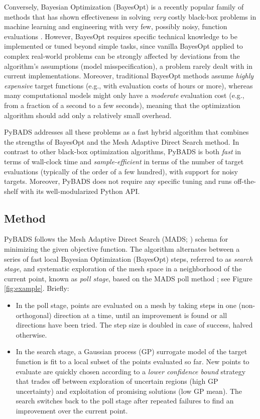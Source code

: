 \documentclass[
]{article}
\begin{document}
Conversely, Bayesian Optimization (BayesOpt) is a recently popular family of methods that has shown effectiveness in solving \textit{very} costly black-box problems in machine learning and engineering with very few, possibly noisy, function evaluations \parencite{garnett_bayesoptbook_2023, reviewBO, agnihotri2020exploring}. However, BayesOpt requires specific technical knowledge to be implemented or tuned beyond simple tasks, since vanilla BayesOpt applied to complex real-world problems can be strongly affected by deviations from the algorithm's assumptions (model misspecification), a problem rarely dealt with in current implementations. Moreover, traditional BayesOpt methods assume \textit{highly expensive} target functions (e.g., with evaluation costs of hours or more), whereas many computational models might only have a \textit{moderate} evaluation cost (e.g., from a fraction of a second to a few seconds), meaning that the optimization algorithm should add only a relatively small overhead. 

PyBADS addresses all these problems as a fast hybrid algorithm that combines the strengths of BayesOpt and the Mesh Adaptive Direct Search \parencite{MADS} method. In contrast to other black-box optimization algorithms, PyBADS is both \textit{fast} in terms of wall-clock time and \textit{sample-efficient} in terms of the number of target evaluations (typically of the order of a few hundred), with support for noisy targets. Moreover, PyBADS does not require any specific tuning and runs off-the-shelf with its well-modularized Python API.

\hypertarget{method}{%
\subsection{Method}\label{method}}
PyBADS follows the Mesh Adaptive Direct Search (MADS; \cite{MADS}) schema for minimizing the given objective function. The algorithm alternates between a series of fast local Bayesian Optimization (BayesOpt) steps, referred to as \textit{search stage}, and systematic exploration of the mesh space in a neighborhood of the current point, known as \textit{poll stage}, based on the MADS poll method \parencite{MADS}; see Figure \ref{fig:example}.
Briefly:
\begin{itemize}
    \item In the poll stage, points are evaluated on a mesh by taking steps in one (non-orthogonal) direction at a time, until an improvement is found or all directions have been tried. The step size is doubled in case of success, halved otherwise.
    \item In the search stage, a Gaussian process (GP) surrogate model \parencite{rasmussen_gaussian_2006} of the target function is fit to a local subset of the points evaluated so far. New points to evaluate are quickly chosen according to a \textit{lower confidence bound} strategy that trades off between exploration of uncertain regions (high GP uncertainty) and exploitation of promising solutions (low GP mean). The search switches back to the poll stage after repeated failures to find an improvement over the current point.
\end{itemize}
\end{document}
